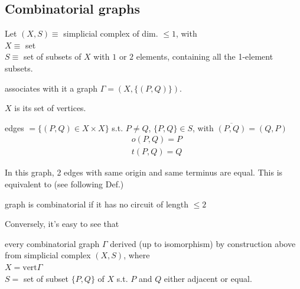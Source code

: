 		
	

\subsection{Combinatorial graphs}

Let $(X,S)\equiv $ simplicial complex of dim. $\leq 1$, with \\
$X \equiv $ set \\
$S \equiv $ set of subsets of $X$ with $1$ or $2$ elements, containing all the 1-element subsets.  

associates with it a graph $\Gamma = (X, \lbrace (P,Q) \rbrace)$.  

$X$ is its set of vertices.  

edges $=\lbrace (P,Q)\in X\times X\rbrace$ s.t. $P\neq Q$, $\lbrace P ,Q \rbrace \in S$, with $\overline{(P,Q)} = (Q,P)$
\[
\begin{aligned}
& o(P,Q) = P \\
& t(P,Q) = Q
\end{aligned}
\]

In this graph, 2 edges with same origin and same terminus are equal.  This is equivalent to (see following Def.)

\begin{definition}
	graph is combinatorial if it has no circuit of length $\leq 2$
\end{definition}
Conversely, it's easy to see that 

every combinatorial graph $\Gamma$ derived (up to isomorphism) by construction above from simplicial complex $(X,S)$, where \\
$X = \text{vert} \Gamma$ \\
$S=$ set of subset $\lbrace P,Q \rbrace$ of $X$ s.t. $P$ and $Q$ either adjacent or equal. 

